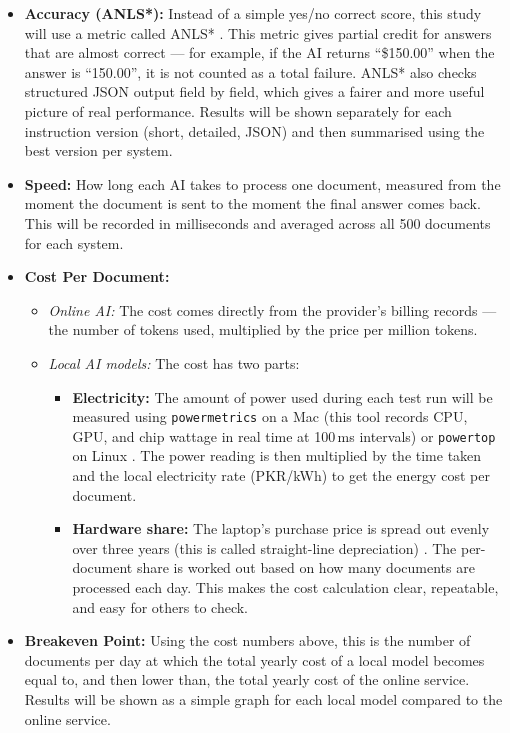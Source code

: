 \begin{itemize}
    \item \textbf{Accuracy (ANLS*):} Instead of a simple yes/no correct score, this study will use a metric called ANLS* \cite{anlsstar_2024}. This metric gives partial credit for answers that are almost correct --- for example, if the AI returns ``\$150.00'' when the answer is ``150.00'', it is not counted as a total failure. ANLS* also checks structured JSON output field by field, which gives a fairer and more useful picture of real performance. Results will be shown separately for each instruction version (short, detailed, JSON) and then summarised using the best version per system.

    \item \textbf{Speed:} How long each AI takes to process one document, measured from the moment the document is sent to the moment the final answer comes back. This will be recorded in milliseconds and averaged across all 500 documents for each system.

    \item \textbf{Cost Per Document:}
    \begin{itemize}
        \item \emph{Online AI:} The cost comes directly from the provider's billing records --- the number of tokens used, multiplied by the price per million tokens.
        \item \emph{Local AI models:} The cost has two parts:
        \begin{itemize}
            \item \textbf{Electricity:} The amount of power used during each test run will be measured using \texttt{powermetrics} on a Mac (this tool records CPU, GPU, and chip wattage in real time at 100\,ms intervals) or \texttt{powertop} on Linux \cite{tokenpowerbench_2024}. The power reading is then multiplied by the time taken and the local electricity rate (PKR/kWh) to get the energy cost per document.
            \item \textbf{Hardware share:} The laptop's purchase price is spread out evenly over three years (this is called straight-line depreciation) \cite{lenovo_tco_2026}. The per-document share is worked out based on how many documents are processed each day. This makes the cost calculation clear, repeatable, and easy for others to check.
        \end{itemize}
    \end{itemize}

    \item \textbf{Breakeven Point:} Using the cost numbers above, this is the number of documents per day at which the total yearly cost of a local model becomes equal to, and then lower than, the total yearly cost of the online service. Results will be shown as a simple graph for each local model compared to the online service.
\end{itemize}

